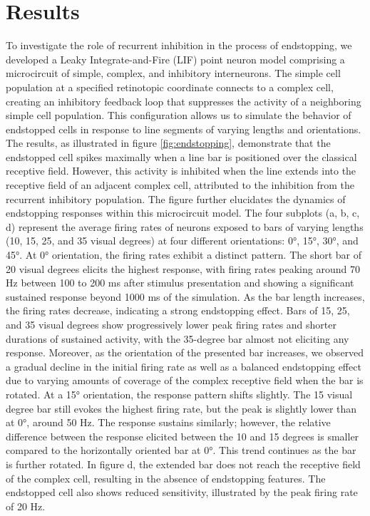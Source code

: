 \documentclass[12pt]{article}
\begin{document}
\section*{Results}
To investigate the role of recurrent inhibition in the process of endstopping, we developed a Leaky Integrate-and-Fire (LIF) point neuron model comprising a microcircuit of simple, complex, and inhibitory interneurons. The simple cell population at a specified retinotopic coordinate connects to a complex cell, creating an inhibitory feedback loop that suppresses the activity of a neighboring simple cell population. This configuration allows us to simulate the behavior of endstopped cells in response to line segments of varying lengths and orientations. The results, as illustrated in figure \ref{fig:endstopping}, demonstrate that the endstopped cell spikes maximally when a line bar is positioned over the classical receptive field. However, this activity is inhibited when the line extends into the receptive field of an adjacent complex cell, attributed to the inhibition from the recurrent inhibitory population.
\bigbreak
The figure further elucidates the dynamics of endstopping responses within this microcircuit model. The four subplots (a, b, c, d) represent the average firing rates of neurons exposed to bars of varying lengths (10, 15, 25, and 35 visual degrees) at four different orientations: 0°, 15°, 30°, and 45°. At 0° orientation, the firing rates exhibit a distinct pattern. The short bar of 20 visual degrees elicits the highest response, with firing rates peaking around 70 Hz between 100 to 200 ms after stimulus presentation and showing a significant sustained response beyond 1000 ms of the simulation. As the bar length increases, the firing rates decrease, indicating a strong endstopping effect. Bars of 15, 25, and 35 visual degrees show progressively lower peak firing rates and shorter durations of sustained activity, with the 35-degree bar almost not eliciting any response. Moreover, as the orientation of the presented bar increases, we observed a gradual decline in the initial firing rate as well as a balanced endstopping effect due to varying amounts of coverage of the complex receptive field when the bar is rotated. At a 15° orientation, the response pattern shifts slightly. The 15 visual degree bar still evokes the highest firing rate, but the peak is slightly lower than at 0°, around 50 Hz. The response sustains similarly; however, the relative difference between the response elicited between the 10 and 15 degrees is smaller compared to the horizontally oriented bar at 0°. This trend continues as the bar is further rotated. In figure d, the extended bar does not reach the receptive field of the complex cell, resulting in the absence of endstopping features. The endstopped cell also shows reduced sensitivity, illustrated by the peak firing rate of 20 Hz.
\end{document}

